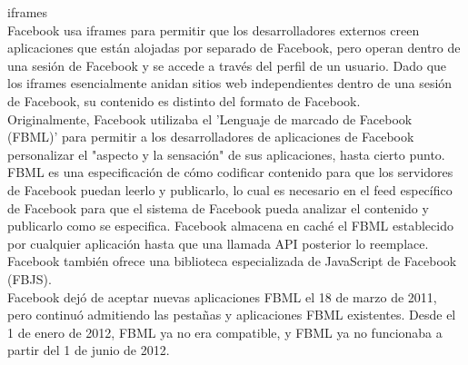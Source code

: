\begin{itemize}
			iframes\\
			Facebook usa iframes para permitir que los desarrolladores externos creen aplicaciones que están alojadas por separado de Facebook, pero operan dentro de una sesión de Facebook y se accede a través del perfil de un usuario. Dado que los iframes esencialmente anidan sitios web independientes dentro de una sesión de Facebook, su contenido es distinto del formato de Facebook. \\
			
			Originalmente, Facebook utilizaba el 'Lenguaje de marcado de Facebook (FBML)' para permitir a los desarrolladores de aplicaciones de Facebook personalizar el "aspecto y la sensación" de sus aplicaciones, hasta cierto punto. FBML es una especificación de cómo codificar contenido para que los servidores de Facebook puedan leerlo y publicarlo, lo cual es necesario en el feed específico de Facebook para que el sistema de Facebook pueda analizar el contenido y publicarlo como se especifica. Facebook almacena en caché el FBML establecido por cualquier aplicación hasta que una llamada API posterior lo reemplace. Facebook también ofrece una biblioteca especializada de JavaScript de Facebook (FBJS).\\
			
			Facebook dejó de aceptar nuevas aplicaciones FBML el 18 de marzo de 2011, pero continuó admitiendo las pestañas y aplicaciones FBML existentes. Desde el 1 de enero de 2012, FBML ya no era compatible, y FBML ya no funcionaba a partir del 1 de junio de 2012. 
		\end{itemize}
		
		
